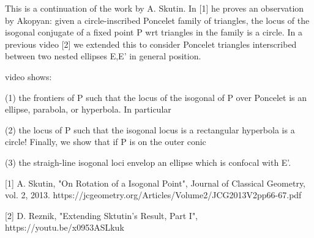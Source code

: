 This is a continuation of the work by A. Skutin. In [1] he proves an observation by Akopyan: given a circle-inscribed Poncelet family of triangles, the locus of the isogonal conjugate of a fixed point P wrt triangles in the family is a circle. In a previous video [2] we extended this to consider Poncelet triangles interscribed between two nested ellipses E,E' in general position.

video shows:

(1) the frontiers of P such that the locus of the isogonal of P over Poncelet is an ellipse, parabola, or hyperbola. In particular

(2) the locus of P such that the isogonal locus is a rectangular hyperbola is a circle! Finally, we show that if P  is on the outer conic

(3) the straigh-line isogonal loci envelop an ellipse which is confocal with E'.

[1] A. Skutin, "On Rotation of a Isogonal Point", Journal of Classical Geometry, vol. 2, 2013. https://jcgeometry.org/Articles/Volume2/JCG2013V2pp66-67.pdf


[2]  D. Reznik,  "Extending Sktutin's Result, Part I", https://youtu.be/x0953ASLkuk